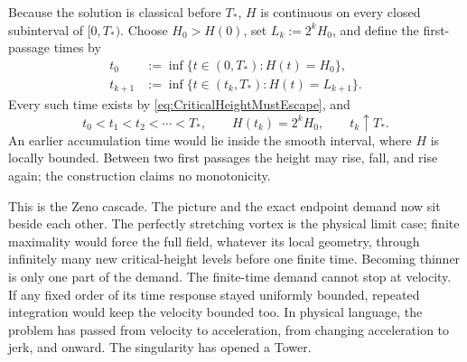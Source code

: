 Because the solution is classical before \(T_*\), \(H\) is continuous on every closed subinterval of \([0,T_*)\).
Choose \(H_0>H(0)\), set \(L_k:=2^kH_0\), and define the first-passage times by
\[
  \begin{aligned}
  t_0
  &:=
  \inf\{t\in(0,T_*):H(t)=H_0\},
  \\
  t_{k+1}
  &:=
  \inf\{t\in(t_k,T_*):H(t)=L_{k+1}\}.
  \end{aligned}
\]
Every such time exists by \eqref{eq:CriticalHeightMustEscape}, and
\begin{equation}\label{eq:ZenoFirstPassageTimes}
  t_0<t_1<t_2<\cdots<T_*,
  \qquad
  H(t_k)=2^kH_0,
  \qquad
  t_k\uparrow T_*.
\end{equation}
An earlier accumulation time would lie inside the smooth interval, where \(H\) is locally bounded.
Between two first passages the height may rise, fall, and rise again; the construction claims no monotonicity.



This is the Zeno cascade.
The picture and the exact endpoint demand now sit beside each other.
The perfectly stretching vortex is the physical limit case; finite maximality would force the full field, whatever its local geometry, through infinitely many new critical-height levels before one finite time.
Becoming thinner is only one part of the demand.
The finite-time demand cannot stop at velocity.
If any fixed order of its time response stayed uniformly bounded, repeated integration would keep the velocity bounded too.
In physical language, the problem has passed from velocity to acceleration, from changing acceleration to jerk, and onward.
The singularity has opened a Tower.
